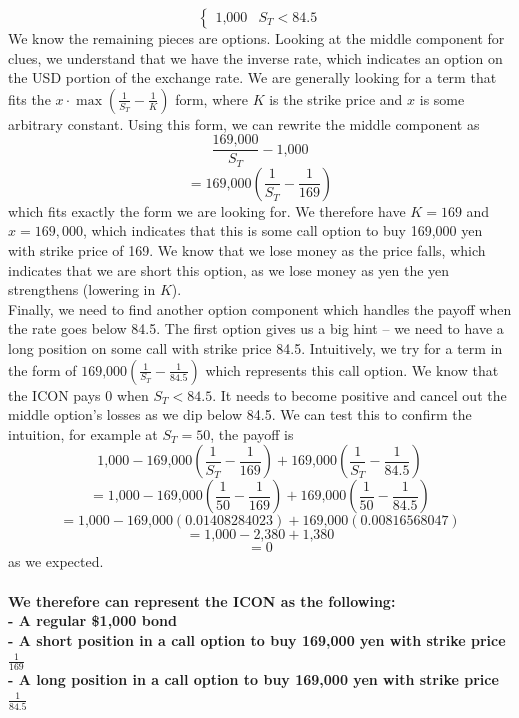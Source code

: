 \documentclass{article}
\begin{document}
{\begin{equation*}
\begin{cases}
    \text{1,000} & S_T < 84.5
  \end{cases}  
\end{equation*}
We know the remaining pieces are options. Looking at the middle component for clues, we understand that we have the inverse rate, which indicates an option on the USD portion of the exchange rate. We are generally looking for a term that fits the \(x \cdot \max(\frac{1}{S_T} - \frac{1}{K})\) form, where \(K\) is the strike price and \(x\) is some arbitrary constant. Using this form, we can rewrite the middle component as 
\[
  \frac{\text{169,000}}{S_T} - \text{1,000}
\]
\[
  = \text{169,000}(\frac{1}{S_T} - \frac{1}{169})
\]
which fits exactly the form we are looking for. We therefore have \(K = 169\) and \(x = 169,000\), which indicates that this is some call option to buy 169,000 yen with strike price of 169. We know that we lose money as the price falls, which indicates that we are short this option, as we lose money as yen the yen strengthens (lowering in \(K\)). \\
Finally, we need to find another option component which handles the payoff when the rate goes below 84.5. The first option gives us a big hint -- we need to have a long position on some call with strike price 84.5. Intuitively, we try for a term in the form of \(\text{169,000}(\frac{1}{S_T} - \frac{1}{84.5})\) which represents this call option. We know that the ICON pays 0 when \(S_T < 84.5\). It needs to become positive and cancel out the middle option's losses as we dip below 84.5. We can test this to confirm the intuition, for example at \(S_T = 50\), the payoff is 
\[
  \text{1,000} - \text{169,000}(\frac{1}{S_T} - \frac{1}{169}) + \text{169,000}(\frac{1}{S_T} - \frac{1}{84.5})
\]
\[
  = \text{1,000} - \text{169,000}(\frac{1}{50} - \frac{1}{169}) + \text{169,000}(\frac{1}{50} - \frac{1}{84.5})
\]
\[
  = \text{1,000} - \text{169,000}(0.01408284023) + \text{169,000}(0.00816568047)
\]
\[
  = \text{1,000} - \text{2,380} + \text{1,380}
\]
\[
  = 0 
\]
as we expected.
\\ \\ 
\textbf{We therefore can represent the ICON as the following: \\
- A regular \$1,000 bond \\
- A short position in a call option to buy 169,000 yen with strike price \(\frac{1}{169}\) \\
- A long position in a call option to buy 169,000 yen with strike price \(\frac{1}{84.5}\)
}

}
\end{document}
